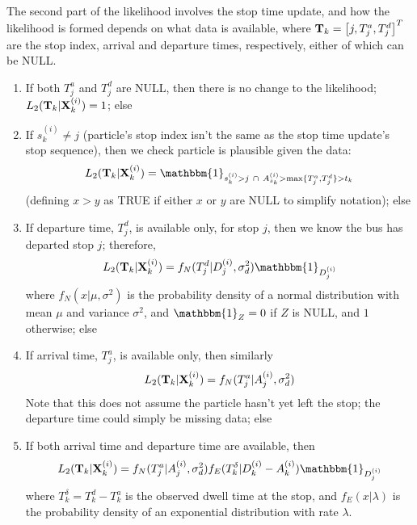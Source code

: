 \documentclass[draftcls,a4paper,onecolumn]{IEEEtran}\usepackage[]{graphicx}\usepackage[]{color}
\begin{document}
The second part of the likelihood involves the stop time update,
and how the likelihood is formed depends on what data is available,
where $\mathbf{T}_k = \left[ j, T^a_j , T^d_j \right]^T$ 
are the stop index, arrival and departure times,
respectively, either of which can be NULL.

\begin{enumerate}
\item 
  If both $T^a_j$ and $T^d_j$ are NULL, 
  then there is no change to the likelihood;
  $ L_2  (\mathbf{T}_k | \mathbf{X}_k^{(i)}) = 1 $; else
  
\item
  If $s_k^{(i)} \neq j$ (particle's stop index isn't the same as the stop time update's stop sequence),
  then we check particle is plausible given the data:
  \begin{equation}
    \label{eq:l2a}
    L_2 (\bT_k | \bX_k^{(i)}) =
    \mathbbm{1}_{s_k^{(i)} > j\ \cap\ A_{s_k}^{(i)} > \max\{T_j^a,T_j^d\} > t_k}
  \end{equation}
  (defining $x > y$ as TRUE if either $x$ or $y$ are NULL to simplify notation); else
  

\item
  If departure time, $T^d_j$, is available only, for stop $j$, then we
  know the bus has departed stop $j$; therefore,
  \begin{equation}
    \label{eq:l2}
    L_2 (\bT_k | \bX_k^{(i)}) =
        f_N(T_j^d | D_j^{(i)}, \sigma_d^2) \mathbbm{1}_{D_j^{(i)}}
  \end{equation}
  where $f_N(x | \mu, \sigma^2)$ is the probability density of a normal distribution
  with mean $\mu$ and variance $\sigma^2$,
  and $\mathbbm{1}_Z = 0$ if $Z$ is NULL, and $1$ otherwise; else
  
\item
  If arrival time, $T^a_j$, is available only, then similarly
  \begin{equation}
    \label{eq:l2b}
    L_2  (\mathbf{T}_k | \mathbf{X}_k^{(i)}) =
      f_N(T_j^a | A_j^{(i)}, \sigma_d^2)
  \end{equation}
  Note that this does not assume the particle hasn't yet left the stop;
  the departure time could simply be missing data; else
  
\item
  If both arrival time and departure time are available, then
  \begin{equation}
    \label{eq:l2c}
    L_2  (\bT_k | \bX_k^{(i)}) =
        f_N(T_j^a| A_j^{(i)}, \sigma_d^2) f_E(T_k^\delta | D_k^{(i)} - A_k^{(i)}) \mathbbm{1}_{D_j^{(i)}}
  \end{equation}
  where $T_k^\delta = T_k^d - T_k^a$ is the observed dwell time at the stop,
  and $f_E(x | \lambda)$ is the probability density of an exponential distribution 
  with rate $\lambda$.
  
\end{enumerate}
\end{document}
